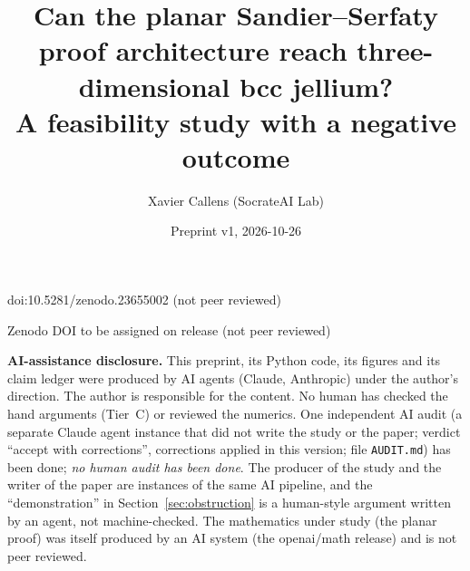 \documentclass[10pt]{article}
\title{Can the planar Sandier--Serfaty proof architecture reach three-dimensional bcc jellium?\\
A feasibility study with a negative outcome}
\author{Xavier Callens (SocrateAI Lab)}
\date{Preprint v1, 2026-10-26}
\theoremstyle{remark}
\begin{document}
\maketitle
\begin{center}\small doi:10.5281/zenodo.23655002 \quad (not peer reviewed)\end{center}

\begin{center}\small Zenodo DOI to be assigned on release \quad (not peer reviewed)\end{center}

\noindent\textbf{AI-assistance disclosure.} This preprint, its Python code, its figures and its claim ledger were produced by AI agents
(Claude, Anthropic) under the author's direction. The author is responsible for the content. No human has checked the hand arguments
(Tier~C) or reviewed the numerics. One independent AI audit (a separate Claude agent instance that did not write the study or the paper; verdict
``accept with corrections'', corrections applied in this version; file \texttt{AUDIT.md}) has been done; \emph{no human audit has been done}. The producer of the study and the writer of
the paper are instances of the same AI pipeline, and the ``demonstration'' in Section~\ref{sec:obstruction} is a human-style argument written
by an agent, not machine-checked. The mathematics under study (the planar proof) was itself produced by an AI system (the openai/math
release) and is not peer reviewed.
\end{document}
